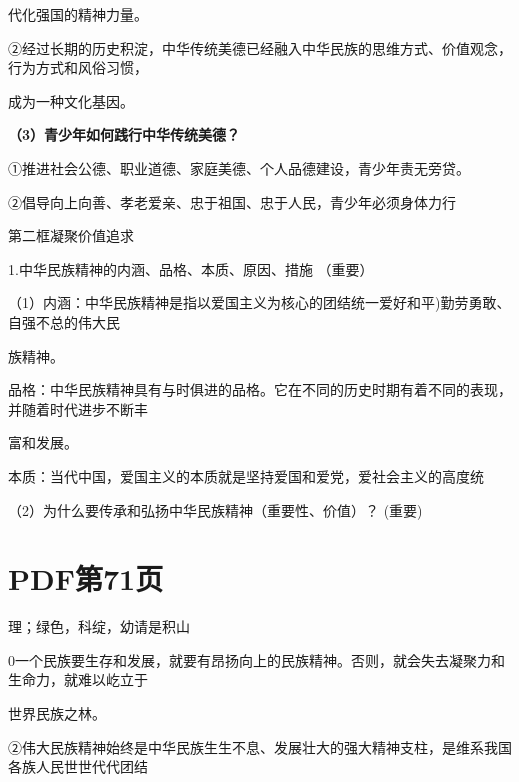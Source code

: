 \documentclass[lang=cn,11pt]{elegantbook}
\newcommand{\daofasym}[1]{{\daofasymbolfont #1}}
\newcommand{\daofasym}[1]{#1}
\begin{document}
代化强国的精神力量。\par

\daofasym{②}经过长期的历史积淀，中华传统美德已经融入中华民族的思维方式、价值观念，行为方式和风俗习惯，\par

成为一种文化基因。\par

\textbf{（3）青少年如何践行中华传统美德？}\par

\daofasym{①}推进社会公德、职业道德、家庭美德、个人品德建设，青少年责无旁贷。\par

\daofasym{②}倡导向上向善、孝老爱亲、忠于祖国、忠于人民，青少年必须身体力行\par

第二框凝聚价值追求\par

1.中华民族精神的内涵、品格、本质、原因、措施 （重要）\par

（1）内涵：中华民族精神是指以爱国主义为核心的团结统一爱好和平)勤劳勇敢、自强不总的伟大民\par

族精神。\par

品格：中华民族精神具有与时俱进的品格。它在不同的历史时期有着不同的表现，并随着时代进步不断丰\par

富和发展。\par

本质：当代中国，爱国主义的本质就是坚持爱国和爱党，爱社会主义的高度统\par

（2）为什么要传承和弘扬中华民族精神（重要性、价值）？ (重要)\par


\section*{PDF第71页}

理；绿色，科绽，幼请是积山\par

0一个民族要生存和发展，就要有昂扬向上的民族精神。否则，就会失去凝聚力和生命力，就难以屹立于\par

世界民族之林。\par

\daofasym{②}伟大民族精神始终是中华民族生生不息、发展壮大的强大精神支柱，是维系我国各族人民世世代代团结\par
\end{document}

